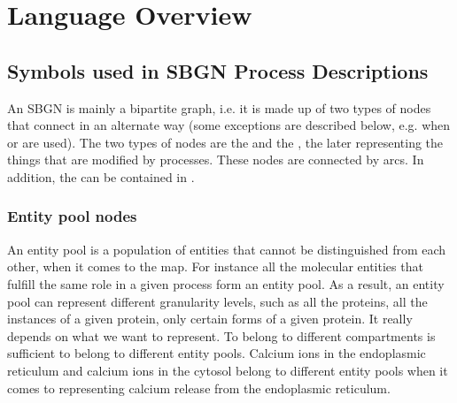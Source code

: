 \chapter{Language Overview}
\label{chp:lang-overview}

\section{Symbols used in SBGN Process Descriptions}
\label{chp:symbols}

An SBGN \PDm is mainly a bipartite graph, i.e. it is made up of two types of nodes that connect in an alternate way (some exceptions are described below, e.g. when \hyperref[sec:logic]{} or  are used). The two types of nodes are the \hyperref[sec:PNs]{} and the \hyperref[sec:EPNs]{}, the later  representing the things that are modified by processes. These nodes are connected by arcs. In addition, the  can be contained in  \hyperref[sec:compartment]{}. %


\subsection{Entity pool nodes}\label{sec:EPNs}

An entity pool is a population of entities that cannot be distinguished from each other, when it comes to the \SBGNPDLone map. For instance all the molecular entities that fulfill the same role in a given process form an entity pool. As a result, an entity pool can represent different granularity levels, such as all the proteins, all the instances of a given protein, only certain forms of a given protein. It really depends on what we want to represent. To belong to different compartments is sufficient to belong to different entity pools. Calcium ions in the endoplasmic reticulum and calcium ions in the cytosol belong to different entity pools when it comes to representing calcium release from the endoplasmic reticulum.

